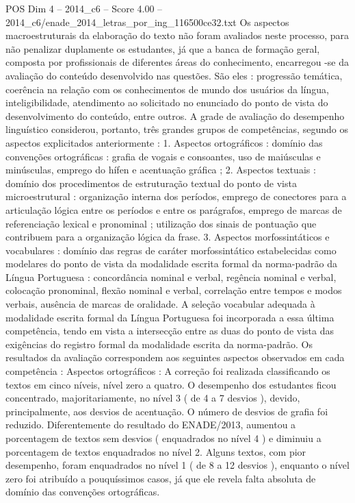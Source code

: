 \begin{textsample}{POS Dim 4 – 2014\_c6 – Score 4.00 – 2014\_c6/enade\_2014\_letras\_por\_ing\_116500ce32.txt}
Os aspectos macroestruturais da elaboração do texto não foram avaliados neste processo, para não penalizar duplamente os estudantes, já que a banca de formação geral, composta por profissionais de diferentes áreas do conhecimento, encarregou -se da avaliação do conteúdo desenvolvido nas questões.
São eles : progressão temática, coerência na relação com os conhecimentos de mundo dos usuários da língua, inteligibilidade, atendimento ao solicitado no enunciado do ponto de vista do desenvolvimento do conteúdo, entre outros.
A grade de avaliação do desempenho linguístico considerou, portanto, três grandes grupos de competências, segundo os aspectos explicitados anteriormente : 1.
Aspectos ortográficos : domínio das convenções ortográficas : grafia de vogais e consoantes, uso de maiúsculas e minúsculas, emprego do hífen e acentuação gráfica ; 2.
Aspectos textuais : domínio dos procedimentos de estruturação textual do ponto de vista microestrutural : organização interna dos períodos, emprego de conectores para a articulação lógica entre os períodos e entre os parágrafos, emprego de marcas de referenciação lexical e pronominal ; utilização dos sinais de pontuação que contribuem para a organização lógica da frase. 3.
Aspectos morfossintáticos e vocabulares : domínio das regras de caráter morfossintático estabelecidas como modelares do ponto de vista da modalidade escrita formal da norma-padrão da Língua Portuguesa : concordância nominal e verbal, regência nominal e verbal, colocação pronominal, flexão nominal e verbal, correlação entre tempos e modos verbais, ausência de marcas de oralidade.
A seleção vocabular adequada à modalidade escrita formal da Língua Portuguesa foi incorporada a essa última competência, tendo em vista a intersecção entre as duas do ponto de vista das exigências do registro formal da modalidade escrita da norma-padrão.
Os resultados da avaliação correspondem aos seguintes aspectos observados em cada competência : Aspectos ortográficos : A correção foi realizada classificando os textos em cinco níveis, nível zero a quatro.
O desempenho dos estudantes ficou concentrado, majoritariamente, no nível 3 ( de 4 a 7 desvios ), devido, principalmente, aos desvios de acentuação.
O número de desvios de grafia foi reduzido.
Diferentemente do resultado do ENADE/2013, aumentou a porcentagem de textos sem desvios ( enquadrados no nível 4 ) e diminuiu a porcentagem de textos enquadrados no nível 2.
Alguns textos, com pior desempenho, foram enquadrados no nível 1 ( de 8 a 12 desvios ), enquanto o nível zero foi atribuído a pouquíssimos casos, já que ele revela falta absoluta de domínio das convenções ortográficas.

\end{textsample}
